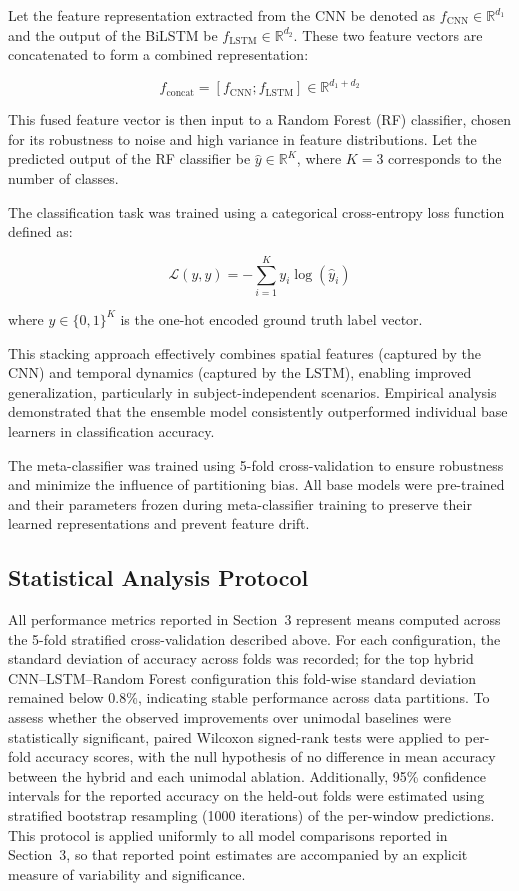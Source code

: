 \documentclass{elektr}
\newcommand{\yh}[1]{{\color{revhi}#1}}  %
\begin{document}
Let the feature representation extracted from the CNN be denoted as $f_{\text{CNN}} \in \mathbb{R}^{d_1}$ and the output of the BiLSTM be $f_{\text{LSTM}} \in \mathbb{R}^{d_2}$. These two feature vectors are concatenated to form a combined representation:

\begin{equation}
	f_{\text{concat}} = [f_{\text{CNN}} ; f_{\text{LSTM}}] \in \mathbb{R}^{d_1 + d_2}
\end{equation}

This fused feature vector is then input to a Random Forest (RF) classifier, chosen for its robustness to noise and high variance in feature distributions. Let the predicted output of the RF classifier be $\hat{y} \in \mathbb{R}^K$, where $K = 3$ corresponds to the number of classes.

The classification task was trained using a categorical cross-entropy loss function defined as:

\begin{equation}
	\mathcal{L}(y, \hat{y}) = -\sum_{i=1}^{K} y_i \log(\hat{y}_i)
\end{equation}

where $y \in \{0, 1\}^K$ is the one-hot encoded ground truth label vector.

This stacking approach effectively combines spatial features (captured by the CNN) and temporal dynamics (captured by the LSTM), enabling improved generalization, particularly in subject-independent scenarios. Empirical analysis demonstrated that the ensemble model consistently outperformed individual base learners in classification accuracy.

The meta-classifier was trained using 5-fold cross-validation to ensure robustness and minimize the influence of partitioning bias. All base models were pre-trained and their parameters frozen during meta-classifier training to preserve their learned representations and prevent feature drift.

\subsection{Statistical Analysis Protocol}
\yh{All performance metrics reported in Section~3 represent means computed across the 5-fold stratified cross-validation described above. For each configuration, the standard deviation of accuracy across folds was recorded; for the top hybrid CNN--LSTM--Random Forest configuration this fold-wise standard deviation remained below 0.8\%, indicating stable performance across data partitions. To assess whether the observed improvements over unimodal baselines were statistically significant, paired Wilcoxon signed-rank tests were applied to per-fold accuracy scores, with the null hypothesis of no difference in mean accuracy between the hybrid and each unimodal ablation. Additionally, 95\% confidence intervals for the reported accuracy on the held-out folds were estimated using stratified bootstrap resampling (1000 iterations) of the per-window predictions. This protocol is applied uniformly to all model comparisons reported in Section~3, so that reported point estimates are accompanied by an explicit measure of variability and significance.}
\end{document}
